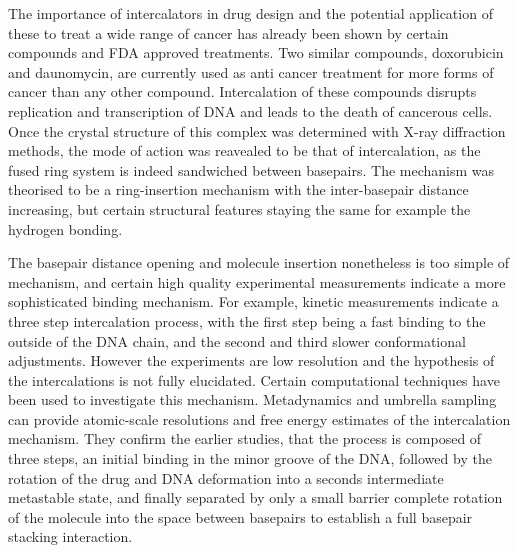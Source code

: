
The importance of intercalators in drug design and the potential application of these to treat a wide range of cancer has already been shown by certain compounds and FDA approved treatments. Two similar compounds, doxorubicin and daunomycin, are currently used as anti cancer treatment for more forms of cancer than any other compound. Intercalation of these compounds disrupts replication and transcription of DNA and leads to the death of cancerous cells. Once the crystal structure of this complex was determined with X-ray diffraction methods, the mode of action was reavealed to be that of intercalation, as the fused ring system is indeed sandwiched between basepairs. The mechanism was theorised to be a ring-insertion mechanism with the inter-basepair distance increasing, but certain structural features staying the same for example the hydrogen bonding.


The basepair distance opening and molecule insertion nonetheless is too simple of mechanism, and certain high quality experimental measurements indicate a more sophisticated binding mechanism. For example, kinetic measurements indicate a three step intercalation process, with the first step being a fast binding to the outside of the DNA chain, and the second and third slower conformational adjustments. However the experiments are low resolution and the hypothesis of the intercalations is not fully elucidated. Certain computational techniques have been used to investigate this mechanism. Metadynamics and umbrella sampling can provide atomic-scale resolutions and free energy estimates of the intercalation mechanism. They confirm the earlier studies, that the process is composed of three steps, an initial binding in the minor groove of the DNA, followed by the rotation of the drug and DNA deformation into a seconds intermediate metastable state, and finally separated by only a small barrier complete rotation of the molecule into the space between basepairs to establish a full basepair stacking interaction.

% 



